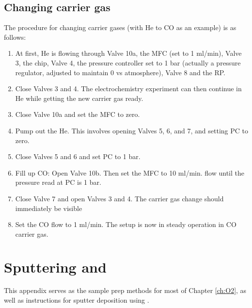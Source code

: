 \subsection{Changing carrier gas}
The procedure for changing carrier gases (with He to CO as an example) is as follows:
\begin{enumerate}
	\item At first, He is flowing through Valve 10a, the MFC (set to 1 ml/min), Valve 3, the chip, Valve 4, the pressure controller set to 1 bar (actually a pressure regulator, adjusted to maintain 0 vs atmosphere), Valve 8 and the RP. 
	
	\item Close Valves 3 and 4. The electrochemistry experiment can then continue in He while getting the new carrier gas ready.
	
	\item Close Valve 10a and set the MFC to zero.
	
	\item Pump out the He. This involves opening Valves 5, 6, and 7, and setting PC to zero.
	
	\item Close Valves 5 and 6 and set PC to 1 bar.
	
	\item Fill up CO: Open Valve 10b. Then set the MFC to 10 ml/min. flow until the pressure read at PC is 1 bar.
	
	\item Close Valve 7 and open Valves 3 and 4. The carrier gas change should immediately be visible 
	
	\item Set the CO flow to 1 ml/min. The setup is now in steady operation in CO carrier gas.
\end{enumerate}


\section{Sputtering  and }\label{app:sputter}

This appendix serves as the sample prep methods for most of Chapter \ref{ch:O2}, as well as instructions for sputter deposition using .

